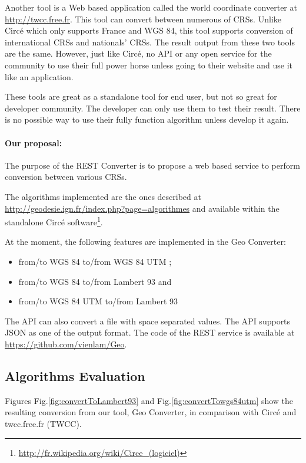 Another tool is a Web based application called the world coordinate converter at \url{http://twcc.free.fr}. This tool can convert between numerous of CRSs. Unlike Circ\'e which only supports France and WGS 84, this tool supports conversion of international CRSs and nationals' CRSs. The result output from these two tools are the same. However, just like Circ\'e, no API or any open service for the community to use their full power horse unless going to their website and use it like an application.

These tools are great as a standalone tool for end user, but not so great for developer community. The developer can only use them to test their result. There is no possible way to use their fully function algorithm unless develop it again. 
\paragraph{Our proposal:} The purpose of the REST Converter is to propose a web based service to perform conversion between various CRSs.

The algorithms implemented are the ones described at \url{http://geodesie.ign.fr/index.php?page=algorithmes} and available within the standalone Circ\'e software\footnote{\url{http://fr.wikipedia.org/wiki/Circe_(logiciel)}}.

At the moment, the following features are implemented in the Geo Converter:
\begin{itemize}
\item from/to WGS 84 to/from WGS 84 UTM ;
\item from/to WGS 84  to/from Lambert 93 and 
\item from/to WGS 84 UTM to/from Lambert 93
\end{itemize}   

The API can also convert a file with space separated values. The API supports JSON as one of the output format. The code of the REST service is available at \url{https://github.com/vienlam/Geo}.

\subsection{Algorithms Evaluation}

Figures Fig.\ref{fig:convertToLambert93} and Fig.\ref{fig:convertTowgs84utm} show the resulting conversion from our tool, Geo Converter, in comparison with Circ\'e and twcc.free.fr (TWCC).


